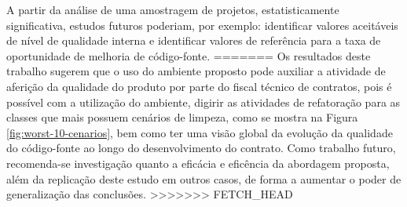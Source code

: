 A partir da análise de uma amostragem de projetos, estatisticamente significativa, estudos futuros poderiam, por exemplo: identificar valores aceitáveis de nível de qualidade interna e identificar valores de referência para a taxa de oportunidade de melhoria de código-fonte.
=======
Os resultados deste trabalho sugerem que o uso do ambiente proposto pode auxiliar a atividade de aferição da qualidade do produto por parte do fiscal técnico de contratos, pois é possível com a utilização do ambiente, digirir as atividades de refatoração para as classes que mais possuem cenários de limpeza, como se mostra na Figura \ref{fig:worst-10-cenarios}, bem como ter uma visão global da evolução da qualidade do código-fonte ao longo do desenvolvimento do contrato. Como trabalho futuro, recomenda-se investigação quanto a eficácia e eficência da abordagem proposta, além da replicação deste estudo em outros casos, de forma a aumentar o poder de generalização das conclusões.
>>>>>>> FETCH_HEAD
